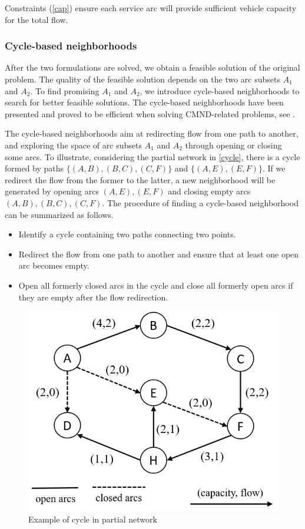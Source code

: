 \documentclass[11pt,nonblindrev,fleqn]{article}
\begin{document}
Constraints (\ref{cap}) ensure each service arc will provide sufficient vehicle capacity for the total flow.

\subsubsection{Cycle-based neighborhoods}
After the two formulations are solved, we obtain a feasible solution of the original problem. The quality of the feasible solution depends on the two arc subsets $A_1$ and $A_2$. To find promising $A_1$ and $A_2$, we introduce cycle-based neighborhoods to search for better feasible solutions. The cycle-based neighborhoods have been presented and proved to be efficient when solving CMND-related problems, see \cite{Ghamlouche2003Cycle, Ghamlouche2004Path,li2017design}.

The cycle-based neighborhoods aim at redirecting flow from one path to another, and exploring the space of arc subsets $A_1$ and $A_2$ through opening or closing some arcs. To illustrate, considering the partial network in \autoref{cycle}, there is a cycle formed by paths $\{ (A,B),(B,C),(C,F) \}$ and $\{ (A,E),(E,F)\}$. If we redirect the flow from the former to the latter, a new neighborhood will be generated by opening arcs $(A,E),(E,F)$ and closing empty arcs $(A,B),(B,C),(C,F)$. The procedure of finding a cycle-based neighborhood can be summarized as follows.
\begin{itemize}
  \item Identify a cycle containing two paths connecting two points.
  \item Redirect the flow from one path to another and ensure that at least one open arc becomes empty.
  \item Open all formerly closed arcs in the cycle and close all formerly open arcs if they are empty after the flow redirection.
\end{itemize}

\begin{figure}[H]
\setlength{\abovecaptionskip}{-5pt}
\setlength{\belowcaptionskip}{-5pt}
\centering
\includegraphics[width=0.5\linewidth]{F2.png}
\caption{Example of cycle in partial network}
\label{cycle}
\end{figure}
\end{document}
